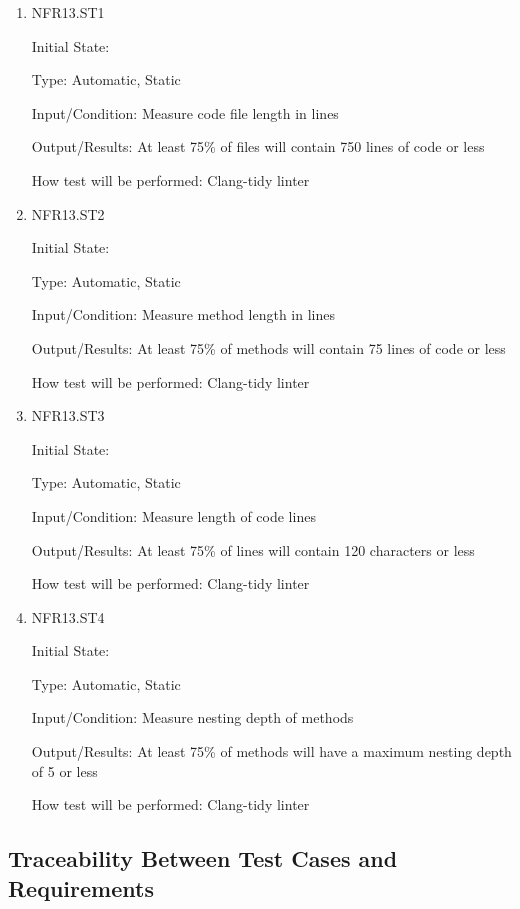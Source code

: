 \documentclass[12pt, titlepage]{article}
\begin{document}
\begin{enumerate}

\item{NFR13.ST1\\}

Initial State: 

Type: Automatic, Static

Input/Condition: Measure code file length in lines

Output/Results: At least 75\% of files will contain 750 lines of code or less

How test will be performed: Clang-tidy linter

\item{NFR13.ST2\\}

Initial State: 

Type: Automatic, Static

Input/Condition: Measure method length in lines

Output/Results: At least 75\% of methods will contain 75 lines of code or less

How test will be performed: Clang-tidy linter

\item{NFR13.ST3\\}

Initial State: 

Type: Automatic, Static

Input/Condition: Measure length of code lines

Output/Results: At least 75\% of lines will contain 120 characters or less

How test will be performed: Clang-tidy linter

\item{NFR13.ST4\\}

Initial State: 

Type: Automatic, Static

Input/Condition: Measure nesting depth of methods

Output/Results: At least 75\% of methods will have a maximum nesting depth of 5 or less

How test will be performed: Clang-tidy linter

\end{enumerate}

\subsection{Traceability Between Test Cases and Requirements}
\end{document}
